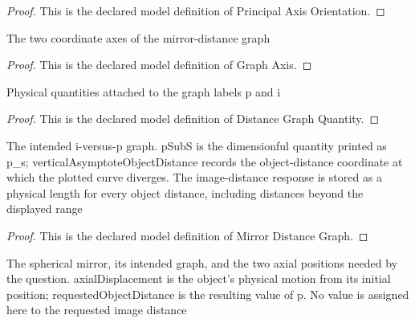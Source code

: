 \begin{proof}
  This is the declared model definition of Principal Axis Orientation.
\end{proof}
\begin{definition}
  \label{def:physics:phyx-mini-0442:phyxminiproblems-problemphyxmini0442-graphaxis}
  The two coordinate axes of the mirror-distance graph
\end{definition}
\begin{proof}
  This is the declared model definition of Graph Axis.
\end{proof}
\begin{definition}
  \label{def:physics:phyx-mini-0442:phyxminiproblems-problemphyxmini0442-distancegraphquantity}
  Physical quantities attached to the graph labels p and i
\end{definition}
\begin{proof}
  This is the declared model definition of Distance Graph Quantity.
\end{proof}
\begin{definition}
  \label{def:physics:phyx-mini-0442:phyxminiproblems-problemphyxmini0442-mirrordistancegraph}
  The intended i-versus-p graph. pSubS is the dimensionful quantity printed as p\_s; verticalAsymptoteObjectDistance records the object-distance coordinate at which the plotted curve diverges. The image-distance response is stored as a physical length for every object distance, including distances beyond the displayed range
\end{definition}
\begin{proof}
  This is the declared model definition of Mirror Distance Graph.
\end{proof}
\begin{definition}
  \label{def:physics:phyx-mini-0442:phyxminiproblems-problemphyxmini0442-sphericalmirrorexperiment}
  The spherical mirror, its intended graph, and the two axial positions needed by the question. axialDisplacement is the object's physical motion from its initial position; requestedObjectDistance is the resulting value of p. No value is assigned here to the requested image distance
\end{definition}
